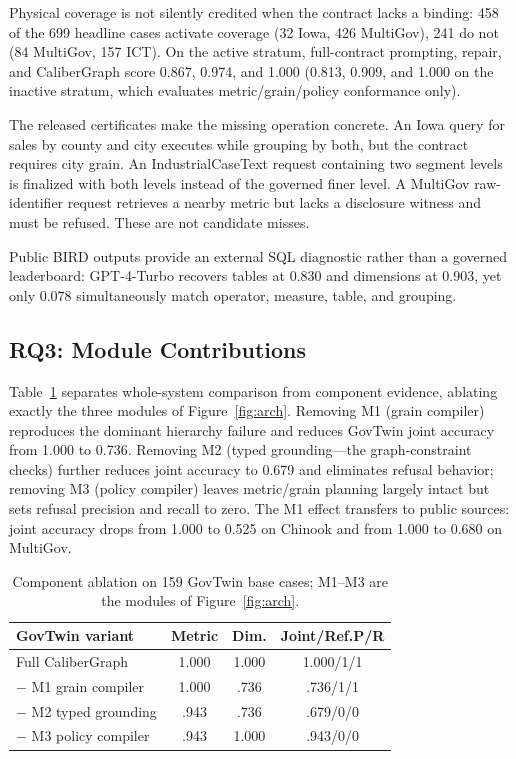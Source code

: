 \documentclass[letterpaper]{article}
\begin{document}
Physical coverage is not silently credited when the contract lacks a binding: 458 of the 699 headline cases activate coverage (32 Iowa, 426 MultiGov), 241 do not (84 MultiGov, 157 ICT). On the active stratum, full-contract prompting, repair, and CaliberGraph score 0.867, 0.974, and 1.000 (0.813, 0.909, and 1.000 on the inactive stratum, which evaluates metric/grain/policy conformance only).

The released certificates make the missing operation concrete. An Iowa query for sales by county and city executes while grouping by both, but the contract requires city grain. An IndustrialCaseText request containing two segment levels is finalized with both levels instead of the governed finer level. A MultiGov raw-identifier request retrieves a nearby metric but lacks a disclosure witness and must be refused. These are not candidate misses.

Public BIRD outputs provide an external SQL diagnostic rather than a governed leaderboard: GPT-4-Turbo recovers tables at 0.830 and dimensions at 0.903, yet only 0.078 simultaneously match operator, measure, table, and grouping.

\subsection{RQ3: Module Contributions}

Table~\ref{tab:ablation} separates whole-system comparison from component evidence, ablating exactly the three modules of Figure~\ref{fig:arch}. Removing M1 (grain compiler) reproduces the dominant hierarchy failure and reduces GovTwin joint accuracy from 1.000 to 0.736. Removing M2 (typed grounding---the graph-constraint checks) further reduces joint accuracy to 0.679 and eliminates refusal behavior; removing M3 (policy compiler) leaves metric/grain planning largely intact but sets refusal precision and recall to zero. The M1 effect transfers to public sources: joint accuracy drops from 1.000 to 0.525 on Chinook \citep{chinook} and from 1.000 to 0.680 on MultiGov.

\begin{table}[t]
\centering
\small
\setlength{\tabcolsep}{3pt}
\begin{tabular}{lccc}
\toprule
GovTwin variant & Metric & Dim. & Joint/Ref.P/R \\
\midrule
Full CaliberGraph & 1.000 & 1.000 & 1.000/1/1 \\
$-$ M1 grain compiler & 1.000 & .736 & .736/1/1 \\
$-$ M2 typed grounding & .943 & .736 & .679/0/0 \\
$-$ M3 policy compiler & .943 & 1.000 & .943/0/0 \\
\bottomrule
\end{tabular}
\caption{Component ablation on 159 GovTwin base cases; M1--M3 are the modules of Figure~\ref{fig:arch}.}
\label{tab:ablation}
\end{table}
\end{document}
